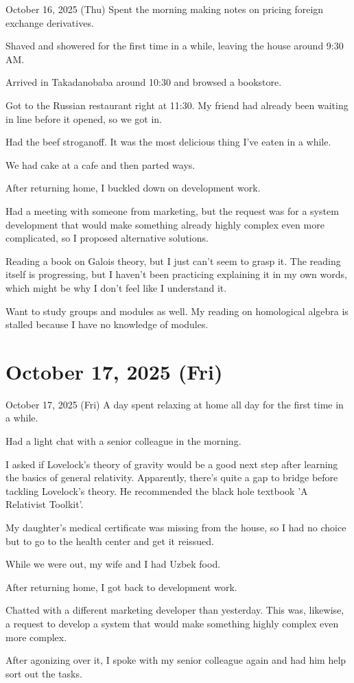 \documentclass[dvipdfmx, autodetect-engine, aspectratio=169, 10.5pt]{beamer}
\begin{document}
\begin{frame}{October 16, 2025 (Thu)}
\scriptsize
Spent the morning making notes on pricing foreign exchange derivatives.

Shaved and showered for the first time in a while, leaving the house around 9:30 AM.

Arrived in Takadanobaba around 10:30 and browsed a bookstore.

Got to the Russian restaurant right at 11:30. My friend had already been waiting in line before it opened, so we got in.

Had the beef stroganoff. It was the most delicious thing I've eaten in a while.

We had cake at a cafe and then parted ways.

After returning home, I buckled down on development work.

Had a meeting with someone from marketing, but the request was for a system development that would make something already highly complex even more complicated, so I proposed alternative solutions.

Reading a book on Galois theory, but I just can't seem to grasp it.
The reading itself is progressing, but I haven't been practicing explaining it in my own words, which might be why I don't feel like I understand it.

Want to study groups and modules as well.
My reading on homological algebra is stalled because I have no knowledge of modules.
\end{frame}

\section{October 17, 2025 (Fri)}

\begin{frame}{October 17, 2025 (Fri)}
A day spent relaxing at home all day for the first time in a while.

Had a light chat with a senior colleague in the morning.

I asked if Lovelock's theory of gravity would be a good next step after learning the basics of general relativity.
Apparently, there's quite a gap to bridge before tackling Lovelock's theory.
He recommended the black hole textbook 'A Relativist Toolkit'.

My daughter's medical certificate was missing from the house, so I had no choice but to go to the health center and get it reissued.

While we were out, my wife and I had Uzbek food.

After returning home, I got back to development work.

Chatted with a different marketing developer than yesterday.
This was, likewise, a request to develop a system that would make something highly complex even more complex.

After agonizing over it, I spoke with my senior colleague again and had him help sort out the tasks.
\end{frame}
\end{document}
